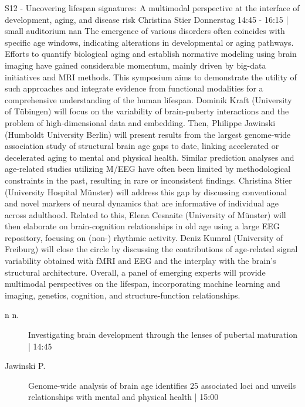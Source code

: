 
            \begin{symposium}
            {S12 - Uncovering lifespan signatures: A multimodal perspective at the interface of development, aging, and disease risk }
            {Christina Stier}
            {Donnerstag 14:45 - 16:15 | small auditorium}
            {nan}
            The emergence of various disorders often coincides with specific age windows, indicating alterations in developmental or aging pathways. Efforts to quantify biological aging and establish normative modeling using brain imaging have gained considerable momentum, mainly driven by big-data initiatives and MRI methods. This symposium aims to demonstrate the utility of such approaches and integrate evidence from functional modalities for a comprehensive understanding of the human lifespan.
Dominik Kraft (University of Tübingen) will focus on the variability of brain-puberty interactions and the problem of high-dimensional data and embedding. Then, Philippe Jawinski (Humboldt University Berlin) will present results from the largest genome-wide association study of structural brain age gaps to date, linking accelerated or decelerated aging to mental and physical health. Similar prediction analyses and age-related studies utilizing M/EEG have often been limited by methodological constraints in the past, resulting in rare or inconsistent findings. Christina Stier (University Hospital Münster) will address this gap by discussing conventional and novel markers of neural dynamics that are informative of individual age across adulthood. Related to this, Elena Cesnaite (University of Münster) will then elaborate on brain-cognition relationships in old age using a large EEG repository, focusing on (non-) rhythmic activity. Deniz Kumral (University of Freiburg) will close the circle by discussing the contributions of age-related signal variability obtained with fMRI and EEG and the interplay with the brain’s structural architecture.
Overall, a panel of emerging experts will provide multimodal perspectives on the lifespan, incorporating machine learning and imaging, genetics, cognition, and structure-function relationships.
            \begin{description}    
            
                \item [n n.] Investigating brain development through the lenses of pubertal maturation \textcolor{mygray}{ | 14:45}    
                
                \item [ Jawinski P.] Genome-wide analysis of brain age identifies 25 associated loci and unveils relationships with mental and physical health \textcolor{mygray}{ | 15:00}    
                

\end{description}
\end{symposium}
